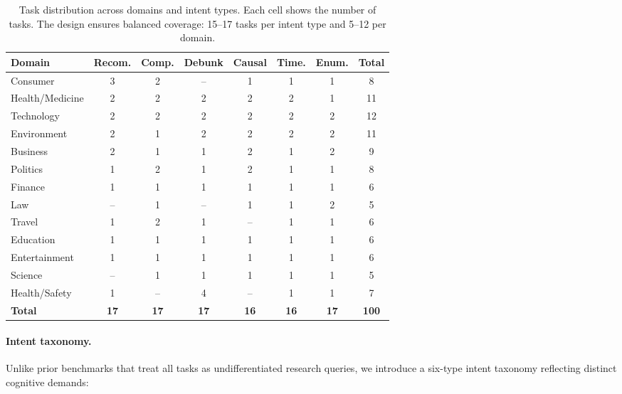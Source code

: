 \documentclass{article}
\begin{document}
\begin{table}[t]
\centering
\caption{Task distribution across domains and intent types. Each cell shows the number of tasks. The design ensures balanced coverage: 15--17 tasks per intent type and 5--12 per domain.}
\label{tab:domain_intent}
\vspace{1mm}
\footnotesize
\setlength{\tabcolsep}{3pt}
\begin{tabular}{@{}lcccccc|c@{}}
\toprule
\textbf{Domain} & \textbf{Recom.} & \textbf{Comp.} & \textbf{Debunk} & \textbf{Causal} & \textbf{Time.} & \textbf{Enum.} & \textbf{Total} \\
\midrule
Consumer         & 3 & 2 & -- & 1 & 1 & 1 & 8 \\
Health/Medicine  & 2 & 2 & 2 & 2 & 2 & 1 & 11 \\
Technology       & 2 & 2 & 2 & 2 & 2 & 2 & 12 \\
Environment      & 2 & 1 & 2 & 2 & 2 & 2 & 11 \\
Business         & 2 & 1 & 1 & 2 & 1 & 2 & 9 \\
Politics         & 1 & 2 & 1 & 2 & 1 & 1 & 8 \\
Finance          & 1 & 1 & 1 & 1 & 1 & 1 & 6 \\
Law              & -- & 1 & -- & 1 & 1 & 2 & 5 \\
Travel           & 1 & 2 & 1 & -- & 1 & 1 & 6 \\
Education        & 1 & 1 & 1 & 1 & 1 & 1 & 6 \\
Entertainment    & 1 & 1 & 1 & 1 & 1 & 1 & 6 \\
Science          & -- & 1 & 1 & 1 & 1 & 1 & 5 \\
Health/Safety    & 1 & -- & 4 & -- & 1 & 1 & 7 \\
\midrule
\textbf{Total}   & \textbf{17} & \textbf{17} & \textbf{17} & \textbf{16} & \textbf{16} & \textbf{17} & \textbf{100} \\
\bottomrule
\end{tabular}
\end{table}

\paragraph{Intent taxonomy.} Unlike prior benchmarks that treat all tasks as undifferentiated research queries, we introduce a six-type intent taxonomy reflecting distinct cognitive demands:
\end{document}
